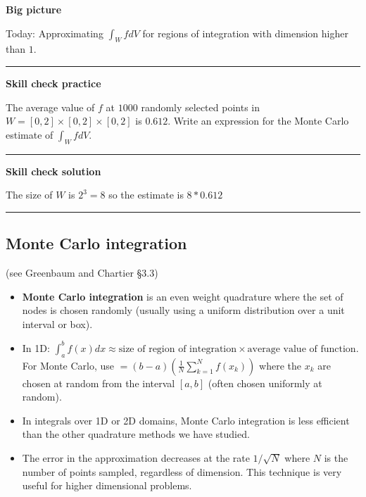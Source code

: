 \documentclass[12pt,letterpaper,noanswers]{exam}
\begin{document}
 \pdfpageheight 11in 
  \pdfpagewidth 8.5in

\noindent 



\noindent\textbf{Big picture}

Today: Approximating $\int_W f dV$ for regions of integration with dimension higher than $1$.

\vspace{0.2cm}
\hrule
\vspace{0.2cm}

\noindent \textbf{Skill check practice}

The average value of $f$ at $1000$ randomly selected points in $W = [0,2]\times[0,2]\times[0,2]$ is $0.612$.  Write an expression for the Monte Carlo estimate of $\int_W f dV$.



\vspace{0.2cm}
\hrule
\vspace{0.2cm}

\noindent \textbf{Skill check solution}

The size of $W$ is $2^3 = 8$ so the estimate is $8*0.612$

\vspace{0.2cm}
\hrule
\vspace{0.2cm}




\subsection*{Monte Carlo integration }

(see Greenbaum and Chartier \S 3.3)

\begin{tcolorbox}
\begin{itemize}
\itemsep0em
    \item \textbf{Monte Carlo integration} is an even weight quadrature where the set of nodes is chosen randomly (usually using a uniform distribution over a unit interval or box).
    \item In 1D: $\displaystyle\int_a^b f(x) dx \approx \text{size of region of integration}\times\text{average value of function}$.  For Monte Carlo, use $= (b-a)\left(\frac{1}{N}\sum\limits_{k=1}^Nf(x_k)\right)$ where the $x_k$ are chosen at random from the interval $[a,b]$ (often chosen uniformly at random).
     \item In integrals over 1D or 2D domains, Monte Carlo integration is less efficient than the other quadrature methods we have studied.
      \item The error in the approximation decreases at the rate $1/\sqrt{N}$ where $N$ is the number of points sampled, regardless of dimension.  This technique is very useful for higher dimensional problems.
\end{itemize}
    \end{tcolorbox}
\end{document}
